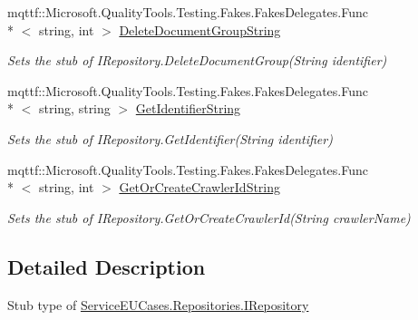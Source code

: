 \begin{DoxyCompactItemize}
mqttf\-::\-Microsoft.\-Quality\-Tools.\-Testing.\-Fakes.\-Fakes\-Delegates.\-Func\\*
$<$ string, int $>$ \hyperlink{class_service_e_u_cases_1_1_repositories_1_1_fakes_1_1_stub_i_repository_a6b857a5666453fd7c026cc80b366a93e}{Delete\-Document\-Group\-String}
\begin{DoxyCompactList}\small\item\em Sets the stub of I\-Repository.\-Delete\-Document\-Group(\-String identifier)\end{DoxyCompactList}\item 
mqttf\-::\-Microsoft.\-Quality\-Tools.\-Testing.\-Fakes.\-Fakes\-Delegates.\-Func\\*
$<$ string, string $>$ \hyperlink{class_service_e_u_cases_1_1_repositories_1_1_fakes_1_1_stub_i_repository_a608784a22fd60aee813b5f8b0637f54f}{Get\-Identifier\-String}
\begin{DoxyCompactList}\small\item\em Sets the stub of I\-Repository.\-Get\-Identifier(\-String identifier)\end{DoxyCompactList}\item 
mqttf\-::\-Microsoft.\-Quality\-Tools.\-Testing.\-Fakes.\-Fakes\-Delegates.\-Func\\*
$<$ string, int $>$ \hyperlink{class_service_e_u_cases_1_1_repositories_1_1_fakes_1_1_stub_i_repository_a3077b6eea8e44618b8d9e12ec9b881dc}{Get\-Or\-Create\-Crawler\-Id\-String}
\begin{DoxyCompactList}\small\item\em Sets the stub of I\-Repository.\-Get\-Or\-Create\-Crawler\-Id(\-String crawler\-Name)\end{DoxyCompactList}\end{DoxyCompactItemize}


\subsection{Detailed Description}
Stub type of \hyperlink{interface_service_e_u_cases_1_1_repositories_1_1_i_repository}{Service\-E\-U\-Cases.\-Repositories.\-I\-Repository}



